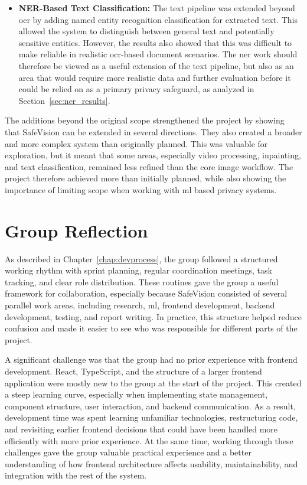 \begin{itemize}
    \medskip

    \item \textbf{NER-Based Text Classification:} The text pipeline was extended beyond \acrshort{ocr} by adding named entity recognition classification for extracted text. This allowed the system to distinguish between general text and potentially sensitive entities. However, the results also showed that this was difficult to make reliable in realistic \acrshort{ocr}-based document scenarios. The \acrshort{ner} work should therefore be viewed as a useful extension of the text pipeline, but also as an area that would require more realistic data and further evaluation before it could be relied on as a primary privacy safeguard, as analyzed in Section~\ref{sec:ner_results}.
\end{itemize}

The additions beyond the original scope strengthened the project by showing that \gls{SafeVision} can be extended in several directions. They also created a broader and more complex system than originally planned. This was valuable for exploration, but it meant that some areas, especially video processing, \gls{inpainting}, and text classification, remained less refined than the core image workflow. The project therefore achieved more than initially planned, while also showing the importance of limiting scope when working with \acrshort{ml} based privacy systems.



\section{Group Reflection}

As described in Chapter~\ref{chap:devprocess}, the group followed a structured working rhythm with sprint planning, regular coordination meetings, task tracking, and clear role distribution. These routines gave the group a useful framework for collaboration, especially because \gls{SafeVision} consisted of several parallel work areas, including research, \acrshort{ml}, frontend development, backend development, testing, and report writing. In practice, this structure helped reduce confusion and made it easier to see who was responsible for different parts of the project.

A significant challenge was that the group had no prior experience with frontend development. React, TypeScript, and the structure of a larger frontend application were mostly new to the group at the start of the project. This created a steep learning curve, especially when implementing state management, component structure, user interaction, and backend communication. As a result, development time was spent learning unfamiliar technologies, restructuring code, and revisiting earlier frontend decisions that could have been handled more efficiently with more prior experience. At the same time, working through these challenges gave the group valuable practical experience and a better understanding of how frontend architecture affects usability, maintainability, and integration with the rest of the system.

